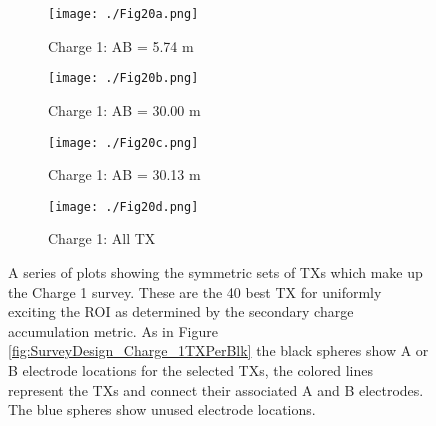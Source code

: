 \documentclass[preprint,authoryear,12pt]{elsarticle}
\providecommand{\DIFaddbeginFL}{} %
\providecommand{\DIFaddendFL}{} %
\providecommand{\DIFdelbeginFL}{} %
\providecommand{\DIFdelendFL}{} %
\begin{document}
\begin{figure} [htp]
   \begin{center}
      \begin{subfigure}{0.7\linewidth}
         \DIFdelbeginFL %
\DIFdelendFL \DIFaddbeginFL \texttt{[image: ./Fig20a.png]}
         \DIFaddendFL \caption{Charge 1: AB = 5.74 m}
         \label{fig:SurveyDesign_Charge1_ABsep5o745m}
      \end{subfigure}

      \begin{subfigure}{0.7\linewidth}
         \DIFdelbeginFL %
\DIFdelendFL \DIFaddbeginFL \texttt{[image: ./Fig20b.png]}
         \DIFaddendFL \caption{Charge 1: AB = 30.00 m}
         \label{fig:SurveyDesign_Charge1_ABsep30m}
      \end{subfigure}

      \begin{subfigure}{0.7\linewidth}
         \DIFdelbeginFL %
\DIFdelendFL \DIFaddbeginFL \texttt{[image: ./Fig20c.png]}
         \DIFaddendFL \caption{Charge 1: AB = 30.13 m}
         \label{fig:SurveyDesign_Charge1_ABsep30o13m}
      \end{subfigure}

      \begin{subfigure}{0.7\linewidth}
         \DIFdelbeginFL %
\DIFdelendFL \DIFaddbeginFL \texttt{[image: ./Fig20d.png]}
         \DIFaddendFL \caption{Charge 1: All TX}
         \label{fig:SurveyDesign_Charge1_Full}
      \end{subfigure}

    \end{center}
    \vspace{-0.5cm}
\caption{A series of plots showing the symmetric sets of TXs which make up the Charge 1 survey. These are the 40 best TX for uniformly exciting the ROI as determined by the secondary charge accumulation metric. As in Figure \ref{fig:SurveyDesign_Charge_1TXPerBlk} the black spheres show A or B electrode locations for the selected TXs, the colored lines represent the TXs and connect their associated A and B electrodes. The blue spheres show unused electrode locations.}
\label{fig:SurveyDesign_Charge1_TXs}
\end{figure}
\end{document}
